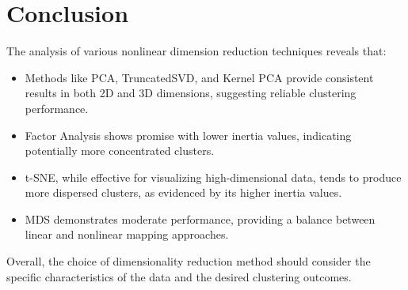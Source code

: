 \documentclass{article}
\begin{document}
\section{Conclusion}
The analysis of various nonlinear dimension reduction techniques reveals that:
\begin{itemize}
    \item Methods like PCA, TruncatedSVD, and Kernel PCA provide consistent results in both 2D and 3D dimensions, suggesting reliable clustering performance.
    \item Factor Analysis shows promise with lower inertia values, indicating potentially more concentrated clusters.
    \item t-SNE, while effective for visualizing high-dimensional data, tends to produce more dispersed clusters, as evidenced by its higher inertia values.
    \item MDS demonstrates moderate performance, providing a balance between linear and nonlinear mapping approaches.
\end{itemize}
Overall, the choice of dimensionality reduction method should consider the specific characteristics of the data and the desired clustering outcomes.
\end{document}
